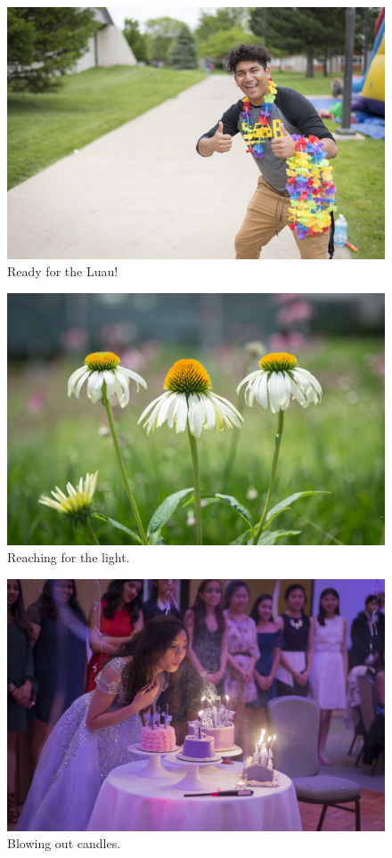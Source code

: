 \documentclass{report}
\begin{document}
\begin{figure}
  \includegraphics[width=\linewidth]{res/actionlei.jpg}
  \caption{Ready for the Luau!}
\end{figure}

\begin{figure}
  \includegraphics[width=\linewidth]{res/symmetricalflowers.jpg}
  \caption{Reaching for the light.}
\end{figure}

\begin{figure}
  \includegraphics[width=\linewidth]{res/blowingoutcandles.jpg}
  \caption{Blowing out candles.}
\end{figure}
\end{document}
